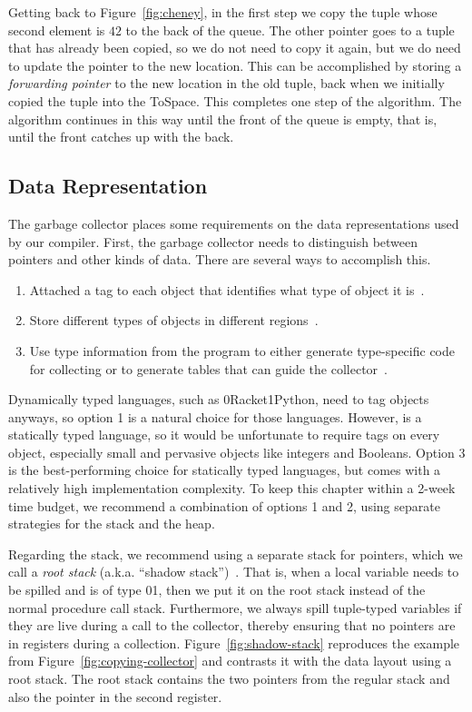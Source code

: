 \documentclass[7x10]{TimesAPriori_MIT}%
\def\racketEd{0}
\def\pythonEd{1}
\def\edition{1}
\newcommand{\racket}[1]{{\if\edition\racketEd{#1}\fi}}
\newcommand{\python}[1]{{\if\edition\pythonEd #1\fi}}
\begin{document}
Getting back to Figure~\ref{fig:cheney}, in the first step we copy the
tuple whose second element is $42$ to the back of the queue. The other
pointer goes to a tuple that has already been copied, so we do not
need to copy it again, but we do need to update the pointer to the new
location. This can be accomplished by storing a \emph{forwarding
pointer} to the new location in the old tuple, back when we initially
copied the tuple into the ToSpace. This completes one step of the
algorithm. The algorithm continues in this way until the front of the
queue is empty, that is, until the front catches up with the back.


\subsection{Data Representation}
\label{sec:data-rep-gc}

The garbage collector places some requirements on the data
representations used by our compiler. First, the garbage collector
needs to distinguish between pointers and other kinds of data. There
are several ways to accomplish this.
\begin{enumerate}
\item Attached a tag to each object that identifies what type of
  object it is~\citep{McCarthy:1960dz}.
\item Store different types of objects in different
  regions~\citep{Steele:1977ab}.
\item Use type information from the program to either generate
  type-specific code for collecting or to generate tables that can
  guide the
  collector~\citep{Appel:1989aa,Goldberg:1991aa,Diwan:1992aa}.
\end{enumerate}
Dynamically typed languages, such as \racket{Racket}\python{Python},
need to tag objects anyways, so option 1 is a natural choice for those
languages.  However, \LangVec{} is a statically typed language, so it
would be unfortunate to require tags on every object, especially small
and pervasive objects like integers and Booleans.  Option 3 is the
best-performing choice for statically typed languages, but comes with
a relatively high implementation complexity. To keep this chapter
within a 2-week time budget, we recommend a combination of options 1
and 2, using separate strategies for the stack and the heap.

Regarding the stack, we recommend using a separate stack for pointers,
which we call a \emph{root stack}
(a.k.a. ``shadow
stack'')~\citep{Siebert:2001aa,Henderson:2002aa,Baker:2009aa}. That
is, when a local variable needs to be spilled and is of type
\racket{}\python{}, then we put it on the
root stack instead of the normal procedure call stack. Furthermore, we
always spill tuple-typed variables if they are live during a call to
the collector, thereby ensuring that no pointers are in registers
during a collection. Figure~\ref{fig:shadow-stack} reproduces the
example from Figure~\ref{fig:copying-collector} and contrasts it with
the data layout using a root stack. The root stack contains the two
pointers from the regular stack and also the pointer in the second
register.
\end{document}
